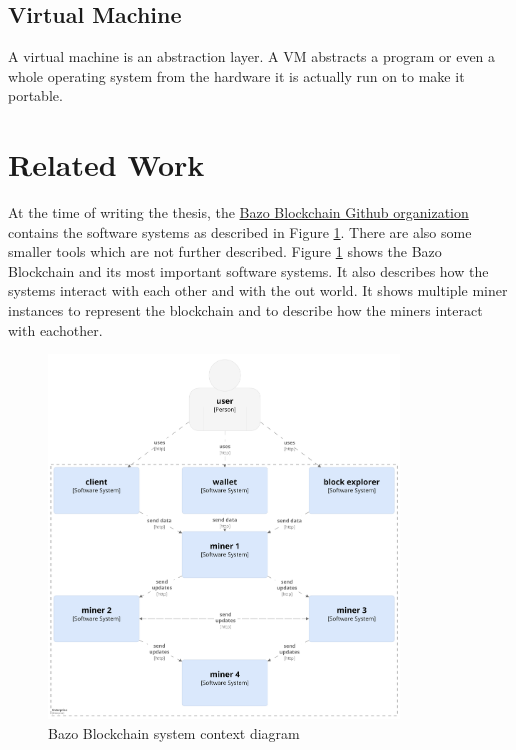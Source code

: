 \subsection{Virtual Machine}
A virtual machine is an abstraction layer. A VM abstracts a program or even a whole operating system from the hardware it is actually run on to make it portable.

\section{Related Work}
At the time of writing the thesis, the \href{https://github.com/bazo-blockchain}{Bazo Blockchain Github organization} contains the software systems as described in Figure \ref{systemcontextdiagram}. There are also some smaller tools which are not further described. Figure \ref{systemcontextdiagram} shows the Bazo Blockchain and its most important software systems.  It also describes how the systems interact with each other and with the out world. It shows multiple miner instances to represent the blockchain and to describe how the miners interact with eachother.

\begin{figure}[H]
	\begin{center}
	\includegraphics[width=0.83\textwidth]{./images/BAZO_System_Context}
	\caption{Bazo Blockchain system context diagram}
	\label{systemcontextdiagram}
	\end{center}
\end{figure}


